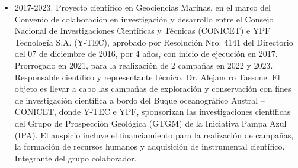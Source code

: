 \documentclass[11pt, a4paper]{article}
\begin{document}
\begin{itemize}
    \item 2017-2023. Proyecto científico en Geociencias Marinas, en el marco del Convenio de colaboración en investigación y desarrollo entre el Consejo Nacional de Investigaciones Científicas y Técnicas (CONICET) e YPF Tecnología S.A. (Y-TEC), aprobado por Resolución Nro. 4141 del Directorio del 07 de diciembre de 2016, por 4 años, con inicio de ejecución en 2017. Prorrogado en 2021, para la realización de 2 campañas en 2022 y 2023. Responsable científico y representante técnico, Dr. Alejandro Tassone. El objeto es llevar a cabo las campañas de exploración y conservación con fines de investigación científica a bordo del Buque oceanográfico Austral – CONICET, donde Y-TEC e YPF, sponsorizan las investigaciones científicas del Grupo de Prospección Geológica (GTGM) de la Iniciativa Pampa Azul (IPA). El auspicio incluye el financiamiento para la realización de campañas, la formación de recursos humanos y adquisición de instrumental científico. Integrante del grupo colaborador.


\end{itemize}
\end{document}
